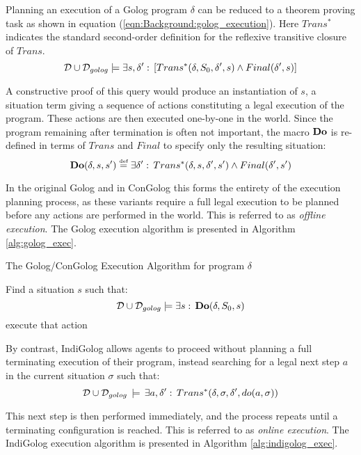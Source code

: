 Planning an execution of a Golog program $\delta$ can be reduced
to a theorem proving task as shown in equation (\ref{eqn:Background:golog_execution}).
Here $Trans^{*}$ indicates the standard second-order definition for
the reflexive transitive closure of $Trans$.\begin{equation}
\mathcal{D}\cup\mathcal{D}_{golog}\models\exists s,\delta':\,\left[Trans^{*}(\delta,S_{0},\delta',s)\wedge Final(\delta',s)\right]\label{eqn:Background:golog_execution}\end{equation}


A constructive proof of this query would produce an instantiation
of $s$, a situation term giving a sequence of actions constituting
a legal execution of the program. These actions are then executed
one-by-one in the world. Since the program remaining after termination
is often not important, the macro $\mathbf{Do}$ is re-defined in terms of
$Trans$ and $Final$ to specify only the resulting situation:\[
\mathbf{Do}(\delta,s,s')\stackrel{\mbox{\tiny def}}{=}\exists\delta':\, Trans^{*}(\delta,s,\delta',s')\wedge Final(\delta',s')\]


In the original Golog and in ConGolog this forms the entirety of the
execution planning process, as these variants require a full legal
execution to be planned before any actions are performed in the world.
This is referred to as \emph{offline execution}. The Golog execution
algorithm is presented in Algorithm \ref{alg:golog_exec}.

%
\begin{algorithm}[t]
\caption{The Golog/ConGolog Execution Algorithm for program $\delta$}


\label{alg:golog_exec} \begin{algorithmic} \STATE Find a situation
$s$ such that:\[
\mathcal{D}\cup\mathcal{D}_{golog}\models\exists s:\,\mathbf{Do}(\delta,S_{0},s)\]
  \STATE execute
that action \ENDFOR \end{algorithmic} 
\end{algorithm}


By contrast, IndiGolog allows agents to proceed without planning a
full terminating execution of their program, instead searching for
a legal next step $a$ in the current situation $\sigma$ such that:\[
\mathcal{D}\cup\mathcal{D}_{golog}\,\models\,\exists a,\delta':\, Trans^{*}(\delta,\sigma,\delta',do(a,\sigma))\]


This next step is then performed immediately, and the process repeats
until a terminating configuration is reached. This is referred to
as \emph{online execution}. The IndiGolog execution algorithm is presented
in Algorithm \ref{alg:indigolog_exec}.

